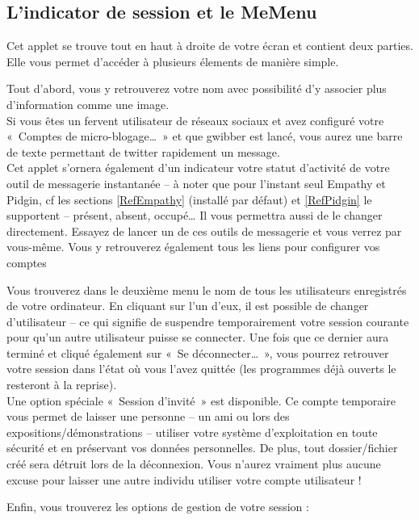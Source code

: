 \subsection{L'indicator de session et le MeMenu}
\label{RefSwitchUser}
Cet applet se trouve tout en haut à droite de votre écran et contient deux parties. Elle vous permet d'accéder à plusieurs élements de manière simple.\par
Tout d'abord, vous y retrouverez votre nom avec possibilité d'y associer plus d'information comme une image. \\
Si vous êtes un fervent utilisateur de réseaux sociaux et avez configuré votre «~Comptes de micro-blogage\ldots{}~» et que gwibber est lancé, vous aurez une barre de texte permettant de twitter rapidement un message.\\
Cet applet s'ornera également d'un indicateur votre statut d'activité de votre outil de messagerie instantanée -- à noter que pour l'instant seul Empathy et Pidgin, cf les sections \ref{RefEmpathy} (installé par défaut) et \ref{RefPidgin} le supportent -- présent, absent, occupé\ldots{} Il vous permettra aussi de le changer directement. Essayez de lancer un de ces outils de messagerie et vous verrez par vous-même. Vous y retrouverez également tous les liens pour configurer vos comptes\par
Vous trouverez dans le deuxième menu le nom de tous les utilisateurs enregistrés de votre ordinateur. En cliquant sur l'un d'eux, il est possible de changer d'utilisateur -- ce qui signifie de suspendre temporairement votre session courante pour qu'un autre utilisateur puisse se connecter. Une fois que ce dernier aura terminé et cliqué également sur «~Se déconnecter\ldots{}~», vous pourrez retrouver votre session dans l'état où vous l'avez quittée (les programmes déjà ouverts le resteront à la reprise).\\
Une option spéciale «~Session d'invité~» est disponible. Ce compte temporaire vous permet de laisser une personne -- un ami ou lors des expositions/\IndicCesure{}démonstrations -- utiliser votre système d'exploitation en toute sécurité et en préservant vos données personnelles. De plus, tout dossier/fichier créé sera détruit lors de la déconnexion. Vous n'aurez vraiment plus aucune excuse pour laisser une autre individu utiliser votre compte utilisateur !\par
Enfin, vous trouverez les options de gestion de votre session :
